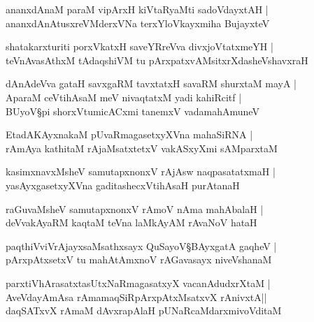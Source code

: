 \begin{shloka}
ananxdAnaM paraM vipArxH kiVtaRyaMti sadoVdayxtAH |\\
ananxdAnAtusxreVMderxVNa terxYloVkayxmiha BujayxteV 
\end{shloka}

\begin{shloka}
shatakarxturiti porxVkatxH saveYRreVva divxjoVtatxmeYH |\\
teVnAvasAthxM tAdaqshiVM tu pArxpatxvAMsitxrXdasheVshavxraH 
\end{shloka}

\begin{shloka}
dAnAdeVva gataH savxgaRM tavxtatxH savaRM shurxtaM mayA |\\
AparaM ceVtihAsaM meV nivaqtatxM yadi kahiRcitf |\\
BUyoV\S pi shorxVtumicACxmi tanemxV vadamahAmuneV 
\end{shloka}

\begin{shloka}
EtadAKAyxnakaM pUvaRmagasetxyXVna mahaSiRNA |\\
rAmAya kathitaM rAjaMsatxtetxV vakASxyXmi sAMparxtaM 
\end{shloka}

\begin{shloka}
kasimxnavxMsheV samutapxnonxV rAjAsw naqpasatatxmaH |\\
yasAyxgasetxyXVna gaditashecxVtihAsaH purAtanaH
\end{shloka}

\begin{shloka}
raGuvaMsheV samutapxnonxV rAmoV nAma mahAbalaH |\\
deVvakAyaRM kaqtaM teVna laMkAyAM rAvaNoV hataH 
\end{shloka}

\begin{shloka}
paqthiVviVrAjayxsaMsathxsayx QuSayoV\S BAyxgatA gaqheV |\\
pArxpAtxsetxV tu mahAtAmxnoV rAGavasayx niveVshanaM 
\end{shloka}

\begin{shloka}
parxtiVhArasatxtasUtxNaRmagasatxyX vacanAdudxrXtaM |\\
AveVdayAmAsa rAmamaqSiR\R pArxpAtxMsatxvX rAnivxtA\R ||\\
daqSATxvX rAmaM dAvxrapAlaH pUNaRcaMdarxmivoVditaM 
\end{shloka}

